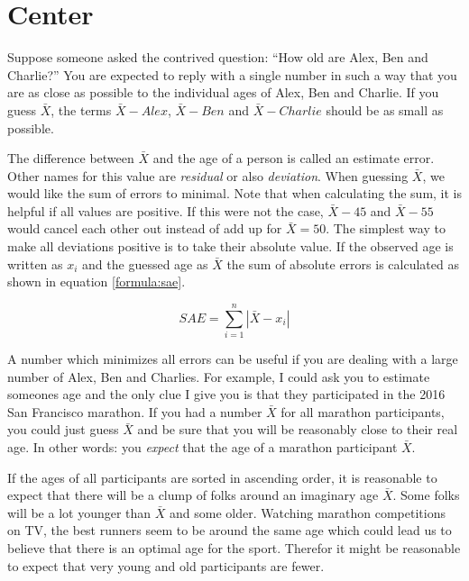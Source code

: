 \documentclass{tufte-book} %
\begin{document}
\section{Center}
Suppose someone asked the contrived question: ``How old are Alex, Ben and Charlie?'' You are expected to reply with a single number in such a way that you are as close as possible to the individual ages of Alex, Ben and Charlie. If you guess $\bar{X}$, the terms $\bar{X} - Alex$, $\bar{X} - Ben$ and $\bar{X} - Charlie$ should be as small as possible.

The difference between $\bar{X}$ and the age of a person is called an estimate error. Other names for this value are {\em residual} or also {\em deviation}. When guessing $\bar{X}$, we would like the sum of errors to minimal. Note that when calculating the sum, it is helpful if all values are positive. If this were not the case, $\bar{X} - 45$ and $\bar{X} - 55$ would cancel each other out instead of add up for $\bar{X} = 50$. The simplest way to make all deviations positive is to take their absolute value. If the observed age is written as $x_i$ and the guessed age as $\bar{X}$ the sum of absolute errors is calculated as shown in equation \ref{formula:sae}.

\begin{equation} \label{formula:sae}
	SAE = \sum_{i=1}^n |\bar{X} - x_i|
\end{equation}

A number which minimizes all errors can be useful if you are dealing with a large number of Alex, Ben and Charlies. For example, I could ask you to estimate someones age and the only clue I give you is that they participated in the 2016 San Francisco marathon. If you had a number $\bar{X}$ for all marathon participants, you could just guess $\bar{X}$ and be sure that you will be reasonably close to their real age. In other words: you {\em expect} that the age of a marathon participant $\bar{X}$.

If the ages of all participants are sorted in ascending order, it is reasonable to expect that there will be a clump of folks around an imaginary age $\bar{X}$. Some folks will be a lot younger than $\bar{X}$ and some older. Watching marathon competitions on TV, the best runners seem to be around the same age which could lead us to believe that there is an optimal age for the sport. Therefor it might be reasonable to expect that very young and old participants are fewer. 
\end{document}
